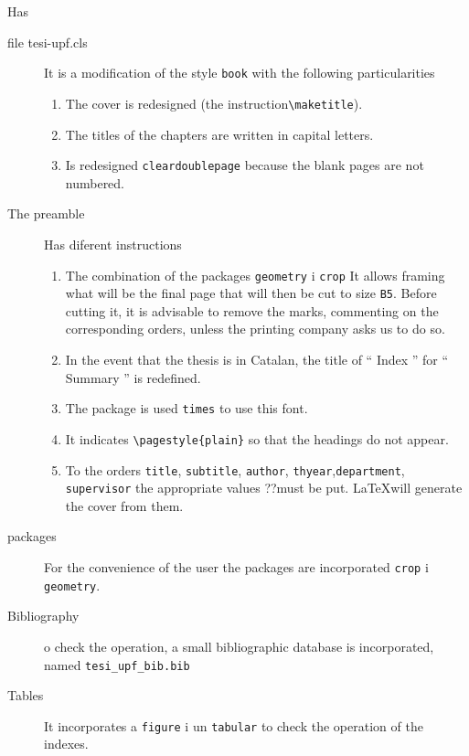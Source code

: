 \documentclass[12pt, b5paper,twoside]{tesi_upf}
\begin{document}
Has
\begin{description}
\item[file tesi-upf.cls] It is a modification of the style {\tt book} with the following particularities
  \begin{enumerate}
  \item The cover is redesigned (the instruction\verb+\maketitle+).

  \item The titles of the chapters are written in capital letters.

  \item Is redesigned {\tt cleardoublepage} because the blank pages are not numbered.
  \end{enumerate}

\item[The preamble] Has diferent instructions
  \begin{enumerate}
  \item The combination of the packages {\tt geometry} i {\tt crop} It allows framing what will be the final page that will then be cut to size {\tt B5}. Before cutting it, it is advisable to remove the marks, commenting on the corresponding orders, unless the printing company asks us to do so.

  \item In the event that the thesis is in Catalan, the title of `` Index '' for `` Summary '' is redefined.

  \item The package is used {\tt times} to use this font.

  \item It indicates \verb+\pagestyle{plain}+ so that the headings do not appear.

  \item  To the orders {\tt title}, {\tt subtitle}, {\tt author}, {\tt thyear},{\tt department}, {\tt supervisor} the appropriate values ??must be put. \LaTeX will generate the cover from them.
  \end{enumerate}

\item[packages] For the convenience of the user the packages are incorporated {\tt crop} i {\tt geometry}. 

\item[Bibliography] o check the operation, a small bibliographic database is incorporated, named  \verb+tesi_upf_bib.bib+


\item[Tables] It incorporates a \verb+figure+ i un \verb+tabular+ to check the operation of the indexes.

\end{description}
\end{document}
